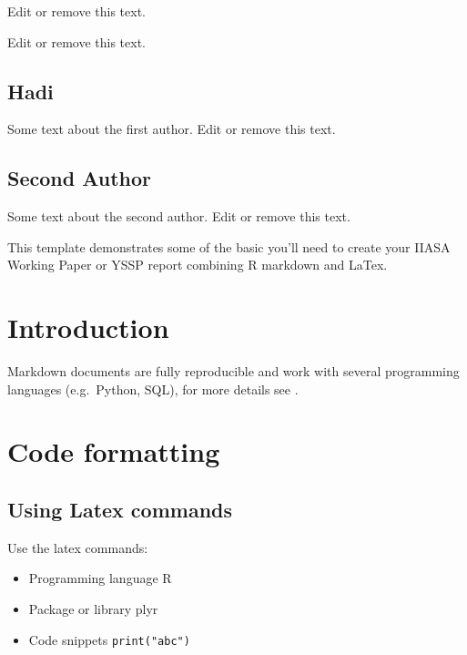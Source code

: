 \documentclass[11pt]{./config/iiir}
\let\proglang=\textsf
\let\code=\texttt
\newcommand{\pkg}[1]{{\fontseries{b}\selectfont #1}}
\providecommand{\tightlist}{%
  \setlength{\itemsep}{0pt}\setlength{\parskip}{0pt}}
\begin{document}
\iicoverpage

Edit or remove this text.

Edit or remove this text.

    \subsection*{Hadi}Some text about the first author. Edit or remove this text.
    \subsection*{Second Author}Some text about the second author. Edit or remove this text.
    
  
This template demonstrates some of the basic you'll need to create your
IIASA Working Paper or YSSP report combining \proglang{R} markdown and
\proglang{LaTex}.




\iilistoffigures

\iibody

\section{Introduction}\label{introduction}

Markdown documents are fully reproducible and work with several
programming languages (e.g.~Python, SQL), for more details see
\citep{RStudio:2016, GitHub:2014}.

\section{Code formatting}\label{code-formatting}

\subsection{Using Latex commands}\label{using-latex-commands}

Use the latex commands:

\begin{itemize}
\tightlist
\item
  Programming language \proglang{R}
\item
  Package or library \pkg{plyr}
\item
  Code snippets \code{print("abc")}
\end{itemize}
\end{document}
